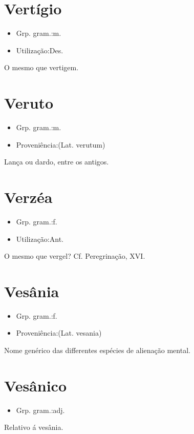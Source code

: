 \documentclass{article}
\begin{document}
\section{Vertígio}
\begin{itemize}
\item {Grp. gram.:m.}
\end{itemize}
\begin{itemize}
\item {Utilização:Des.}
\end{itemize}
O mesmo que \textunderscore vertigem\textunderscore .
\section{Veruto}
\begin{itemize}
\item {Grp. gram.:m.}
\end{itemize}
\begin{itemize}
\item {Proveniência:(Lat. \textunderscore verutum\textunderscore )}
\end{itemize}
Lança ou dardo, entre os antigos.
\section{Verzéa}
\begin{itemize}
\item {Grp. gram.:f.}
\end{itemize}
\begin{itemize}
\item {Utilização:Ant.}
\end{itemize}
O mesmo que \textunderscore vergel\textunderscore ? Cf. \textunderscore Peregrinação\textunderscore , XVI.
\section{Vesânia}
\begin{itemize}
\item {Grp. gram.:f.}
\end{itemize}
\begin{itemize}
\item {Proveniência:(Lat. \textunderscore vesania\textunderscore )}
\end{itemize}
Nome genérico das differentes espécies de alienação mental.
\section{Vesânico}
\begin{itemize}
\item {Grp. gram.:adj.}
\end{itemize}
Relativo á vesânia.
\end{document}
